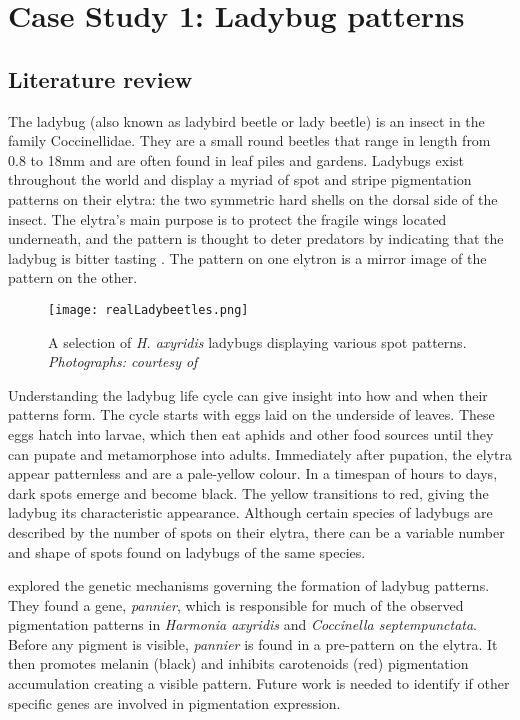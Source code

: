\chapter{Case Study 1: Ladybug patterns}

\section{Literature review}
The ladybug (also known as ladybird beetle or lady beetle) is an insect in the family Coccinellidae. They are a small round beetles that range in length from 0.8 to 18mm \citep{King1996} and are often found in leaf piles and gardens. Ladybugs exist throughout the world and display a myriad of spot and stripe pigmentation patterns on their elytra: the two symmetric hard shells on the dorsal side of the insect. The elytra's main purpose is to protect the fragile wings located underneath, and the pattern is thought to deter predators by indicating that the ladybug is bitter tasting \citep{King1996}. The pattern on one elytron is a mirror image of the pattern on the other. 

\begin{figure}[ht]
	\centering
	\texttt{[image: realLadybeetles.png]}
	\caption{A selection of \textit{H. axyridis} ladybugs displaying various spot patterns. \textit{Photographs: courtesy of \citet{entomart2019}}}
	\label{fig:realLadyBugPatterns}
\end{figure}

Understanding the ladybug life cycle can give insight into how and when their patterns form. The cycle starts with eggs laid on the underside of leaves. These eggs hatch into larvae, which then eat aphids and other food sources until they can pupate and metamorphose into adults. Immediately after pupation, the elytra appear patternless and are a pale-yellow colour. In a timespan of hours to days, dark spots emerge and become black. The yellow transitions to red, giving the ladybug its characteristic appearance. Although certain species of ladybugs are described by the number of spots on their elytra, there can be a variable number and shape of spots found on ladybugs of the same species.

\citet{Ando2018} explored the genetic mechanisms governing the formation of ladybug patterns. They found a gene, \textit{pannier}, which is responsible for much of the observed pigmentation patterns in \textit{Harmonia axyridis} and \textit{Coccinella septempunctata}. Before any pigment is visible, \textit{pannier} is found in a pre-pattern on the elytra. It then promotes melanin (black) and inhibits carotenoids (red) pigmentation accumulation creating a visible pattern. Future work is needed to identify if other specific genes are involved in pigmentation expression.

